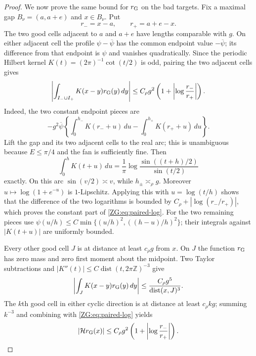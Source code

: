 \documentclass[11pt]{amsart}
\numberwithin{equation}{section}
\theoremstyle{definition}
\theoremstyle{remark}
\newcommand{\Hil}{\mathcal H}
\begin{document}
\begin{proof}
We now prove the same bound for $r_{\rm G}$ on the bad targets.  Fix a
maximal gap $B_\nu=(a,a+e)$ and $x\in B_\nu$.  Put
\[
 r_-=x-a,\qquad r_+=a+e-x.
\]
The two good cells adjacent to $a$ and $a+e$ have lengths comparable
with $g$.  On either adjacent cell the profile
$\psi-\overline\psi$ has the common endpoint value
$-\overline\psi$; its difference from that endpoint is $\psi$ and
vanishes quadratically.  Since the periodic Hilbert kernel
$K(t)=(2\pi)^{-1}\cot(t/2)$ is odd, pairing the two adjacent cells gives
\begin{equation}\label{ZG:eq:paired-log}
 \left|\int_{I_- \cup I_+}K(x-y)r_{\rm G}(y)\,dy\right|
 \le C_\rho g^2
 \left(1+\left|\log\frac{r_-}{r_+}\right|\right).
\end{equation}
Indeed, the two constant endpoint pieces are
\[
 -g^2\overline\psi
 \left\{\int_0^{h_-}K(r_-+u)\,du
       -\int_0^{h_+}K(r_++u)\,du\right\}.
\]
Lift the gap and its two adjacent cells to the real arc; this is
unambiguous because $E\le\pi/4$ and the fan is sufficiently fine.  Then
\[
 \int_0^hK(t+u)\,du
 =\frac1\pi\log\frac{\sin((t+h)/2)}{\sin(t/2)}
\]
exactly.  On this arc $\sin(v/2)\asymp v$, while
$h_\pm\asymp_\rho g$.  Moreover
$u\mapsto\log(1+e^{-u})$ is $1$-Lipschitz.  Applying this with
$u=\log(t/h)$ shows that the difference of the two logarithms is bounded
by $C_\rho+|\log(r_-/r_+)|$, which proves the constant part of
\eqref{ZG:eq:paired-log}.  For the two remaining pieces use
$\psi(u/h)\le C\min\{(u/h)^2,((h-u)/h)^2\}$; their integrals against
$|K(t+u)|$ are uniformly bounded.

Every other good cell $J$ is at distance at least $c_\rho g$ from $x$.
On $J$ the function $r_{\rm G}$ has zero mass and zero first moment
about the midpoint.  Two Taylor subtractions and
$|K''(t)|\le C\operatorname {dist}(t,2\pi\mathbb Z)^{-3}$ give
\[
 \left|\int_JK(x-y)r_{\rm G}(y)\,dy\right|
 \le \frac{C_\rho g^5}{\operatorname {dist}(x,J)^3}.
\]
The $k$th good cell in either cyclic direction is at distance at least
$c_\rho kg$; summing $k^{-3}$ and combining with
\eqref{ZG:eq:paired-log} yields
\begin{equation}\label{ZG:eq:gap-pointwise}
 |\Hil r_{\rm G}(x)|
 \le C_\rho g^2
 \left(1+\left|\log\frac{r_-}{r_+}\right|\right).
\end{equation}


\end{proof}
\end{document}

